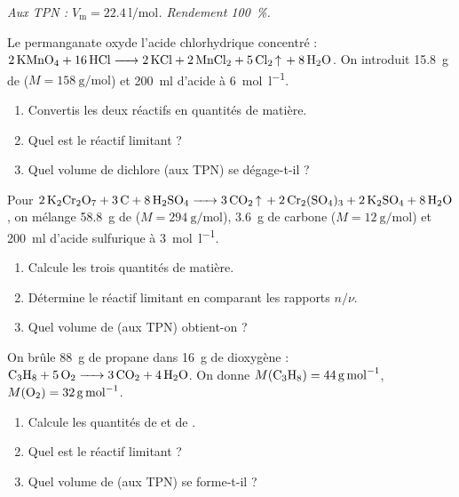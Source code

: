 \documentclass[11pt,a4paper]{article}
\begin{document}
\begin{center}\small\itshape
Aux TPN : $V_{\mathrm{m}}=\qty{22.4}{\litre\per\mole}$. Rendement \qty{100}{\percent}.
\end{center}

\begin{exo}
Le permanganate oxyde l'acide chlorhydrique concentré :
$\ce{2 KMnO4 + 16 HCl -> 2 KCl + 2 MnCl2 + 5 Cl2 ^ + 8 H2O}$. On introduit \qty{15.8}{\gram} de
 ($M=\qty{158}{\gram\per\mole}$) et \qty{200}{\milli\litre} d'acide à \qty{6}{\mole\per\litre}.
\begin{enumerate}[label=\alph*)]
  \item Convertis les deux réactifs en quantités de matière.
  \item Quel est le réactif limitant ?
  \item Quel volume de dichlore  (aux TPN) se dégage-t-il ?
\end{enumerate}
\end{exo}

\begin{exo}
Pour $\ce{2 K2Cr2O7 + 3 C + 8 H2SO4 -> 3 CO2 ^ + 2 Cr2(SO4)3 + 2 K2SO4 + 8 H2O}$, on mélange
\qty{58.8}{\gram} de  ($M=\qty{294}{\gram\per\mole}$), \qty{3.6}{\gram} de carbone
($M=\qty{12}{\gram\per\mole}$) et \qty{200}{\milli\litre} d'acide sulfurique à \qty{3}{\mole\per\litre}.
\begin{enumerate}[label=\alph*)]
  \item Calcule les trois quantités de matière.
  \item Détermine le réactif limitant en comparant les rapports $n/\nu$.
  \item Quel volume de  (aux TPN) obtient-on ?
\end{enumerate}
\end{exo}

\begin{exo}
On brûle \qty{88}{\gram} de propane dans \qty{16}{\gram} de dioxygène :
$\ce{C3H8 + 5 O2 -> 3 CO2 + 4 H2O}$. On donne $M(\ce{C3H8})=\qty{44}{\gram\per\mole}$,
$M(\ce{O2})=\qty{32}{\gram\per\mole}$.
\begin{enumerate}[label=\alph*)]
  \item Calcule les quantités de  et de .
  \item Quel est le réactif limitant ?
  \item Quel volume de  (aux TPN) se forme-t-il ?
\end{enumerate}
\end{exo}
\end{document}
